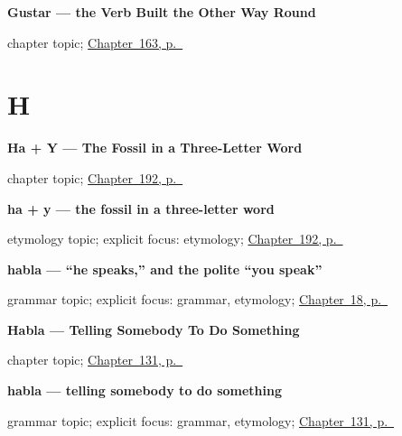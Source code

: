 \noindent\begin{minipage}[t]{\linewidth}
\raggedright
\textbf{Gustar — the Verb Built the Other Way Round}\par
\footnotesize chapter topic; \hyperref[ch:spanish-gustar]{Chapter~163, p.~\pageref*{ch:spanish-gustar}}
\end{minipage}\par\smallskip

\section*{H}

\noindent\begin{minipage}[t]{\linewidth}
\raggedright
\textbf{Ha + Y --- The Fossil in a Three-Letter Word}\par
\footnotesize chapter topic; \hyperref[ch:hay-etymology]{Chapter~192, p.~\pageref*{ch:hay-etymology}}
\end{minipage}\par\smallskip

\noindent\begin{minipage}[t]{\linewidth}
\raggedright
\textbf{ha + y — the fossil in a three-letter word}\par
\footnotesize etymology topic; explicit focus: etymology; \hyperref[ch:hay-etymology]{Chapter~192, p.~\pageref*{ch:hay-etymology}}
\end{minipage}\par\smallskip

\noindent\begin{minipage}[t]{\linewidth}
\raggedright
\textbf{habla — \textquotedblleft{}he speaks,\textquotedblright{} and the polite \textquotedblleft{}you speak\textquotedblright{}}\par
\footnotesize grammar topic; explicit focus: grammar, etymology; \hyperref[ch:habla]{Chapter~18, p.~\pageref*{ch:habla}}
\end{minipage}\par\smallskip

\noindent\begin{minipage}[t]{\linewidth}
\raggedright
\textbf{Habla --- Telling Somebody To Do Something}\par
\footnotesize chapter topic; \hyperref[ch:command-tu]{Chapter~131, p.~\pageref*{ch:command-tu}}
\end{minipage}\par\smallskip

\noindent\begin{minipage}[t]{\linewidth}
\raggedright
\textbf{habla — telling somebody to do something}\par
\footnotesize grammar topic; explicit focus: grammar, etymology; \hyperref[ch:command-tu]{Chapter~131, p.~\pageref*{ch:command-tu}}
\end{minipage}\par\smallskip

